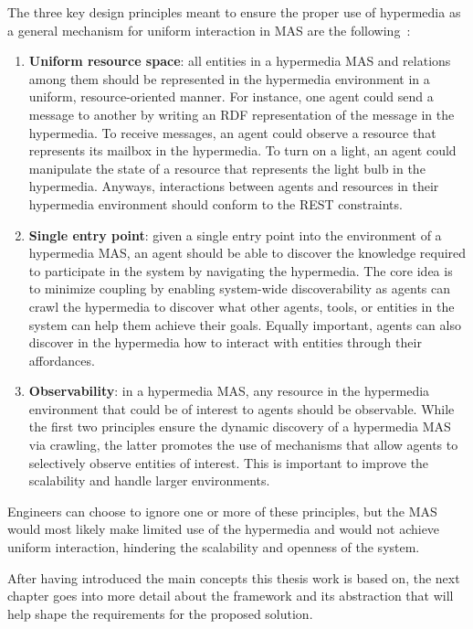 The three key design principles meant to ensure the proper use of hypermedia as a general mechanism for uniform interaction in MAS are the following~\cite{10.1007/978-3-030-25693-7_15}:
\begin{enumerate}
    \item \textbf{Uniform resource space}: all entities in a hypermedia MAS and relations among them should be represented in the hypermedia environment in a uniform, resource-oriented manner.
    For instance, one agent could send a message to another by writing an RDF representation of the message in the hypermedia.
    To receive messages, an agent could observe a resource that represents its mailbox in the hypermedia.
    To turn on a light, an agent could manipulate the state of a resource that represents the light bulb in the hypermedia.
    Anyways, interactions between agents and resources in their hypermedia environment should conform to the REST constraints.
    \item \textbf{Single entry point}: given a single entry point into the environment of a hypermedia MAS, an agent should be able to discover the knowledge required to participate in the system by navigating the hypermedia.
    The core idea is to minimize coupling by enabling system-wide discoverability as agents can crawl the hypermedia to discover what other agents, tools, or entities in the system can help them achieve their goals.
    Equally important, agents can also discover in the hypermedia how to interact with entities through their affordances.
    \item \textbf{Observability}: in a hypermedia MAS, any resource in the hypermedia environment that could be of interest to agents should be observable.
    While the first two principles ensure the dynamic discovery of a hypermedia MAS via crawling, the latter promotes the use of mechanisms that allow agents to selectively observe entities of interest.
    This is important to improve the scalability and handle larger environments.
\end{enumerate}

Engineers can choose to ignore one or more of these principles, but the MAS would most likely make limited use of the hypermedia and would not achieve uniform interaction, hindering the scalability and openness of the system.

After having introduced the main concepts this thesis work is based on, the next chapter goes into more detail about the \moise{} framework and its abstraction that will help shape the requirements for the proposed solution.
